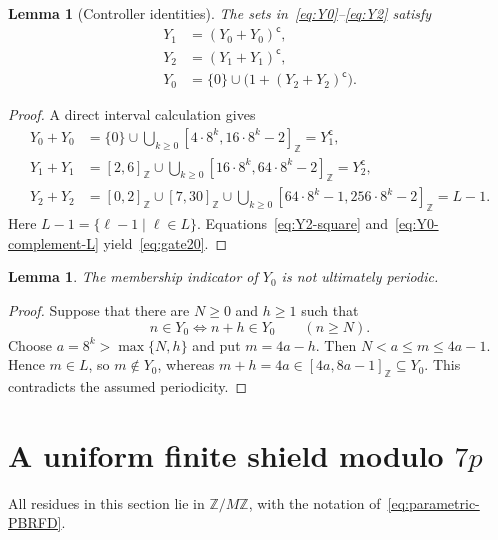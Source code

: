 \documentclass[11pt,letterpaper]{article}
\newtheorem{lemma}[theorem]{Lemma}
\newcommand{\ZM}{\mathbb{Z}/M\mathbb{Z}}
\newcommand{\cpl}[1]{#1^{\mathsf{c}}}
\newcommand{\ints}[2]{[#1,#2]_{\mathbb{Z}}}
\begin{document}
\begin{lemma}[Controller identities]\label{lem:controller}
The sets in~\eqref{eq:Y0}--\eqref{eq:Y2} satisfy
\begin{align}
Y_1&=\cpl{(Y_0+Y_0)},                                      \label{eq:gate01}\\
Y_2&=\cpl{(Y_1+Y_1)},                                      \label{eq:gate12}\\
Y_0&=\{0\}\cup\bigl(1+\cpl{(Y_2+Y_2)}\bigr).             \label{eq:gate20}
\end{align}
\end{lemma}

\begin{proof}
A direct interval calculation gives
\begin{align}
Y_0+Y_0
&=\{0\}\cup\bigcup_{k\geq0}
  \ints{4\cdot8^k}{16\cdot8^k-2}=\cpl{Y_1},
  \label{eq:Y0-square}\\
Y_1+Y_1
&=\ints{2}{6}\cup\bigcup_{k\geq0}
  \ints{16\cdot8^k}{64\cdot8^k-2}=\cpl{Y_2},
  \label{eq:Y1-square}\\
Y_2+Y_2
&=\ints{0}{2}\cup\ints{7}{30}\cup\bigcup_{k\geq0}
  \ints{64\cdot8^k-1}{256\cdot8^k-2}=L-1.
  \label{eq:Y2-square}
\end{align}
Here \(L-1=\{\ell-1\mid\ell\in L\}\).
Equations~\eqref{eq:Y2-square} and~\eqref{eq:Y0-complement-L} yield~\eqref{eq:gate20}.
\end{proof}

\begin{lemma}\label{lem:Y0-aperiodic}
The membership indicator of \(Y_0\) is not ultimately periodic.
\end{lemma}

\begin{proof}
Suppose that there are \(N\geq0\) and \(h\geq1\) such that
\[
n\in Y_0\iff n+h\in Y_0
\qquad(n\geq N).
\]
Choose \(a=8^k>\max\{N,h\}\) and put \(m=4a-h\). Then \(N<a\leq m\leq4a-1\). Hence \(m\in L\), so \(m\notin Y_0\), whereas \(m+h=4a\in\ints{4a}{8a-1}\subseteq Y_0\). This contradicts the assumed periodicity.
\end{proof}

\section{A uniform finite shield modulo \texorpdfstring{\(7p\)}{7p}}

All residues in this section lie in \(\ZM\), with the notation of~\eqref{eq:parametric-PBRFD}.
\end{document}
